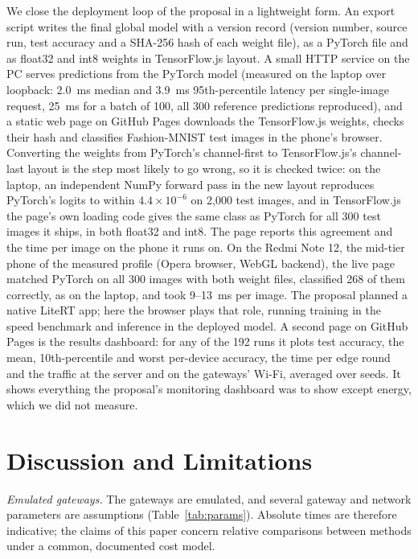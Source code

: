 \documentclass[conference]{IEEEtran}
\begin{document}
We close the deployment loop of the proposal in a lightweight form. An export script writes the final global model with a version record (version number, source run, test accuracy and a SHA-256 hash of each weight file), as a PyTorch file and as float32 and int8 weights in TensorFlow.js layout. A small HTTP service on the PC serves predictions from the PyTorch model (measured on the laptop over loopback: 2.0~ms median and 3.9~ms 95th-percentile latency per single-image request, 25~ms for a batch of 100, all 300 reference predictions reproduced), and a static web page on GitHub Pages downloads the TensorFlow.js weights, checks their hash and classifies Fashion-MNIST test images in the phone's browser. Converting the weights from PyTorch's channel-first to TensorFlow.js's channel-last layout is the step most likely to go wrong, so it is checked twice: on the laptop, an independent NumPy forward pass in the new layout reproduces PyTorch's logits to within $4.4 \times 10^{-6}$ on 2{,}000 test images, and in TensorFlow.js the page's own loading code gives the same class as PyTorch for all 300 test images it ships, in both float32 and int8. The page reports this agreement and the time per image on the phone it runs on. On the Redmi Note 12, the mid-tier phone of the measured profile (Opera browser, WebGL backend), the live page matched PyTorch on all 300 images with both weight files, classified 268 of them correctly, as on the laptop, and took 9--13~ms per image. The proposal planned a native LiteRT app; here the browser plays that role, running training in the speed benchmark and inference in the deployed model. A second page on GitHub Pages is the results dashboard: for any of the 192 runs it plots test accuracy, the mean, 10th-percentile and worst per-device accuracy, the time per edge round and the traffic at the server and on the gateways' Wi-Fi, averaged over seeds. It shows everything the proposal's monitoring dashboard was to show except energy, which we did not measure.

\section{Discussion and Limitations}
\label{sec:discussion}

\textit{Emulated gateways.} The gateways are emulated, and several gateway and network parameters are assumptions (Table~\ref{tab:params}). Absolute times are therefore indicative; the claims of this paper concern relative comparisons between methods under a common, documented cost model.
\end{document}
